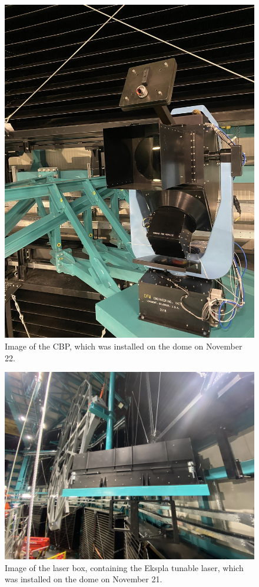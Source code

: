 \begin{figure}[htbp]
  \begin{center}
    \includegraphics[height=0.6\textheight]{throughput_for_focused_light_figures/cbp_on_dome_2}
  \end{center}
  \caption{Image of the CBP, which was installed on the dome on November 22.}
  \label{fig:cbp_2}
\end{figure}
  
\begin{figure}[htbp]
  \includegraphics[height=0.5\textheight]{throughput_for_focused_light_figures/laser_on_dome}
  \caption{Image of the laser box, containing the Ekspla tunable laser, which was installed on the dome on November 21.}
  \label{fig:laser}
\end{figure}
